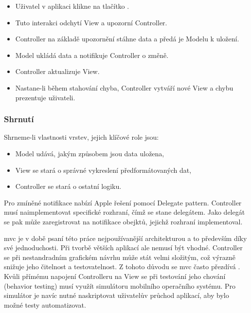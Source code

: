 \begin{itemize}
  \item Uživatel v aplikaci klikne na tlačítko .
  \item Tuto interakci odchytí View a upozorní Controller.
  \item Controller na základě upozornění stáhne data a předá je Modelu k uložení.
  \item Model ukládá data a notifikuje Controller o změně.
  \item Controller aktualizuje View.
  \item Nastane-li během stahování chyba, Controller vytváří nové View a chybu prezentuje uživateli.
\end{itemize}


\subsubsection*{Shrnutí}

Shrneme-li vlastnosti vrstev, jejich klíčové role jsou:

\begin{itemize}
  \item Model udává, jakým způsobem jsou data uložena,
  \item View se stará o správné vykreslení předformátovaných dat,
  \item Controller se stará o ostatní logiku.
\end{itemize}


Pro zmíněné notifikace nabízí Apple řešení pomocí Delegate pattern.
Controller musí naimplementovat specifické rozhraní, čímž se stane delegátem.
Jako delegát se pak může zaregistrovat na notifikace obejktů, jejichž rozhraní implementoval.

\acrshort{mvc} je v době psaní této práce nejpoužívanější architekturou a to především díky své jednoduchosti.
Při tvorbě větších aplikací ale nemusí být vhodné.
Controller se při nestandradním grafickém návrhu může stát velmi složitým, což výrazně snižuje jeho čitelnost a testovatelnost.
Z tohoto důvodu se \acrshort{mvc} často přezdívá .
Kvůli přímému napojení Controlleru na View se při testování jeho chování (behavior testing) musí využít simulátoru mobilního operačního systému.
Pro simulátor je navíc nutné naskriptovat uživatelův průchod aplikací, aby bylo možné testy automatizovat.

